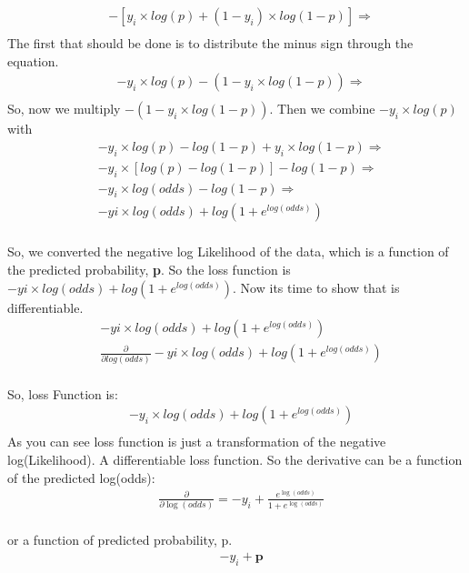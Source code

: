 \documentclass[12pt, a4paper]{article} %
\begin{document}
\begin{align*}
    & -[y_{i} \times log(p) + (1 - y_{i}) \times log(1 - p)] \Rightarrow\\
    \end{align*}
The first that should be done is to distribute the minus sign through the equation.
    \begin{align*}
        & - y_{i} \times log(p) - (1 - y_{i} \times log(1 - p)) \Rightarrow\\
    \end{align*}
So, now we multiply $ - (1 - y_{i} \times log(1 - p))$. Then we combine $- y_{i} \times log(p)$ with 
        \begin{align*}
    & -y_{i} \times log(p) -log(1 - p) + y_{i} \times log(1 - p) \Rightarrow\\
    & - y_{i} \times [log(p) - log(1 - p)] - log(1 - p) \Rightarrow\\
    & - y_{i} \times log(odds) - log(1 - p) \Rightarrow\\
    & - y{i} \times log(odds) + log(1 + e^{log(odds)})\\
\end{align*}

So, we converted the negative log Likelihood of the data, which is a function of the predicted probability, \textbf{p}. So the loss function is $- y{i} \times log(odds) + log(1 + e^{log(odds)})$. Now its time to show that is differentiable.
\begin{align*}
    & - y{i} \times log(odds) + log(1 + e^{log(odds)})\\
    & \frac{\partial}{\partial log(odds)} - y{i} \times log(odds) + log(1 + e^{log(odds)})\\
    & 
\end{align*}

So, loss Function is:
\begin{align*}
    & - y_{i} \times log(odds) + log(1 + e^{log(odds)})\\
\end{align*}
As you can see loss function is just a transformation of the negative log(Likelihood). A differentiable loss function. So the derivative can be a function  of the predicted log(odds):
\begin{align*}
    & \frac{\partial}{\partial \log(odds)} = -y_{i} + \frac{e^{\log(odds)}}{1 + e^{\log(odds)}}\\
\end{align*}

or a function of predicted probability, p.
\begin{align*}
    & -y_{i} + \textbf{p}\\
\end{align*}
\end{document}
